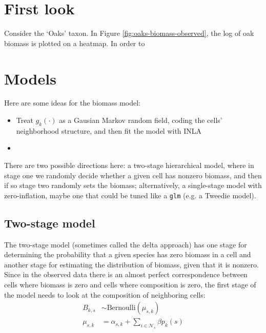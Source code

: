 \documentclass[authoryear, review, 11pt]{elsarticle}
\begin{document}
\section{First look}
Consider the `Oaks' taxon. In Figure \ref{fig:oaks-biomass-observed}, the log of oak biomass is plotted on a heatmap. In order to \\


\section{Models}
Here are some ideas for the biomass model:\*
\begin{itemize}
  \item Treat $g_k(\cdot)$ as a Gausian Markov random field, coding the cells' neighborhood structure, and then fit the model with INLA
  \item 
\end{itemize}

There are two possible directions here: a two-stage hierarchical model, where in stage one we randomly decide whether a given cell has nonzero biomass, and then if so stage two randomly sets the biomass; alternatively, a single-stage model with zero-inflation, maybe one that could be tuned like a \verb!glm! (e.g. a Tweedie model).\\


\subsection{Two-stage model}
The two-stage model (sometimes called the delta approach) has one stage for determining the probability that a given species has zero biomass in a cell and another stage for estimating the distribution of biomass, given that it is nonzero. Since in the observed data there is an almost perfect correspondence between cells where biomass is zero and cells where composition is zero, the first stage of the model needs to look at the composition of neighboring cells:\*
\begin{equation*}
  \begin{split}
    B_{k,s} &\sim \text{Bernoulli}(\mu_{s,k})\\
    \mu_{s, k} &= \alpha_{s,k} + \sum\limits_{i \in \mathcal{N}_s} \beta p_k(s)
  \end{split}
\end{equation*}
\end{document}
